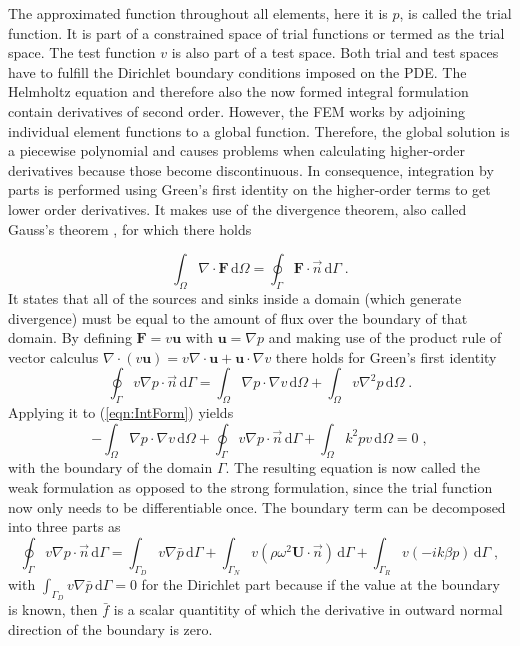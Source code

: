 \documentclass[%
  a4paper,oneside,%
  11pt,%
  smallchapters,
  style=printdev,
  extramargin,
  green,%
  rgb, <cmyk>
  ]{tubsbook}
\begin{document}
The approximated function throughout all elements, here it is $p$, is called the trial function. It is part of a constrained space of trial functions or termed as the trial space. The test function $v$ is also part of a test space. Both trial and test spaces have to fulfill the Dirichlet boundary conditions imposed on the PDE.
The Helmholtz equation and therefore also the now formed integral formulation contain derivatives of second order. However, the FEM works by adjoining individual element functions to a global function. Therefore, the global solution is a piecewise polynomial \cite{langtangen2019} and causes problems when calculating higher-order derivatives because those become discontinuous. In consequence, integration by parts is performed using Green's first identity \cite[pp. 53,54]{atalla2015} on the higher-order terms to get lower order derivatives. It makes use of the divergence theorem, also called Gauss's theorem \cite[p. 1006]{arens2015}, for which there holds

\begin{equation}
\int_{\Omega}  \nabla \cdot \bm{F} \,\mathrm{d}\Omega = \oint_{\Gamma} \bm{F} \cdot \vec{n} \,\mathrm{d}\Gamma \; .
\label{eqn:DivTheo}
\end{equation}
It states that all of the sources and sinks inside a domain (which generate divergence) must be equal to the amount of flux over the boundary of that domain. 
By defining  $\bm{F} = v \bm{u}$ with $\bm{u} = \nabla p$ and making use of the product rule of vector calculus $\nabla \cdot (v \bm{u}) = v \nabla \cdot \bm{u} + \bm{u} \cdot \nabla v$ there holds for Green's first identity
\begin{equation}
\oint_{\Gamma} v \nabla p \cdot \vec{n} \,\mathrm{d}\Gamma = \int_{\Omega} \nabla p \cdot \nabla v \,\mathrm{d}\Omega + \int_{\Omega}  v\nabla^2 p \,\mathrm{d}\Omega \; .
\end{equation}
%
Applying it to (\ref{eqn:IntForm}) yields
\begin{equation}
-\int_{\Omega} \nabla p \cdot \nabla v \,\mathrm{d}\Omega + \oint_{\Gamma} v \nabla p \cdot \vec{n} \,\mathrm{d}\Gamma+ \int_{\Omega} k^2 pv \,\mathrm{d}\Omega = 0 \;,
\label{eqn:WeakHelmholtz}
\end{equation}
with the boundary of the domain $\Gamma$.
The resulting equation is now called the weak formulation as opposed to the strong formulation, since the trial function now only needs to be differentiable once.
The boundary term can be decomposed into three parts as
\begin{equation}
\oint_{\Gamma} v \nabla p \cdot \vec{n} \,\mathrm{d}\Gamma = \int_{\Gamma_D} v \nabla \bar{p}  \,\mathrm{d}\Gamma + \int_{\Gamma_N} v (\rho \omega^2 \bm{U} \cdot \vec{n})  \,\mathrm{d}\Gamma + \int_{\Gamma_R} v(-ik\beta p)  \,\mathrm{d}\Gamma \;,
\label{eqn:BCsHelmholtz}
\end{equation}
with $\int_{\Gamma_D} v \nabla \bar{p}  \,\mathrm{d}\Gamma = 0$ for the Dirichlet part because if the value at the boundary is known, then $\bar{f}$ is a scalar quantitity of which the derivative in outward normal direction of the boundary is zero.
\end{document}
